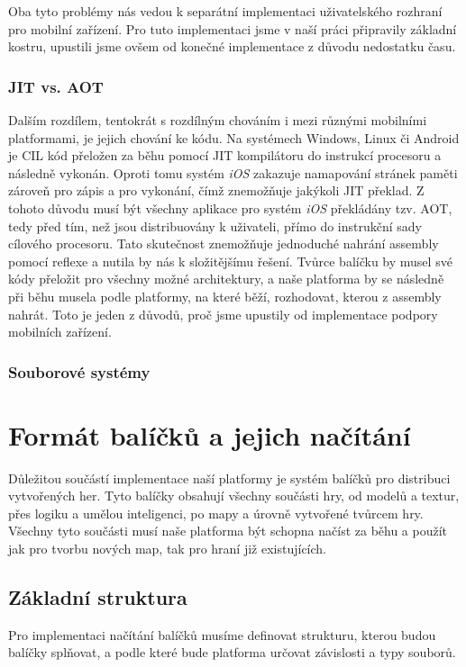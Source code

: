 Oba tyto problémy nás vedou k separátní implementaci uživatelského rozhraní pro mobilní zařízení. Pro tuto implementaci jsme v naší práci připravily základní kostru, upustili jsme ovšem od konečné implementace z důvodu nedostatku času.

\subsubsection{JIT vs. AOT}
Dalším rozdílem, tentokrát s rozdílným chováním i mezi různými mobilními platformami, je jejich chování ke kódu. Na systémech Windows, Linux či Android je CIL kód přeložen za běhu pomocí JIT kompilátoru do instrukcí procesoru a následně vykonán. Oproti tomu systém \emph{iOS} zakazuje namapování stránek paměti zároveň pro zápis a pro vykonání, čímž znemožňuje jakýkoli JIT překlad. Z tohoto důvodu musí být všechny aplikace pro systém \emph{iOS} překládány tzv. AOT, tedy před tím, než jsou distribuovány k uživateli, přímo do instrukční sady cílového procesoru.\citep{site:aot} Tato skutečnost znemožňuje jednoduché nahrání assembly pomocí reflexe a nutila by nás k složitějšímu řešení. 
Tvůrce balíčku by musel své kódy přeložit pro všechny možné architektury, a naše platforma by se následně při běhu musela podle platformy, na které běží, rozhodovat, kterou z assembly nahrát. Toto je jeden z důvodů, proč jsme upustily od implementace podpory mobilních zařízení.

\subsubsection{Souborové systémy}





\section{Formát balíčků a jejich načítání}
Důležitou součástí implementace naší platformy je systém balíčků pro distribuci vytvořených her. Tyto balíčky obsahují všechny součásti hry, od modelů a textur, přes logiku a umělou inteligenci, po mapy a úrovně vytvořené tvůrcem hry. Všechny tyto součásti musí naše platforma být schopna načíst za běhu a použít jak pro tvorbu nových map, tak pro hraní již existujících.

\subsection{Základní struktura}
Pro implementaci načítání balíčků musíme definovat strukturu, kterou budou balíčky splňovat, a podle které bude platforma určovat závislosti a typy souborů. 

